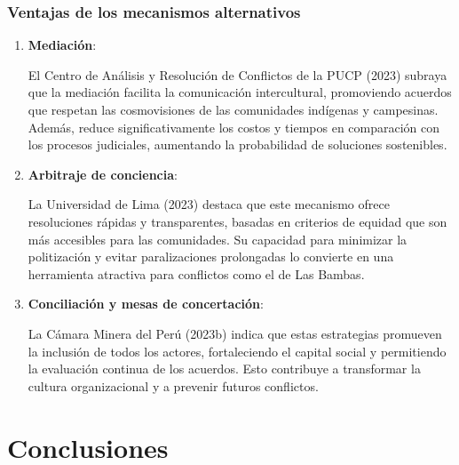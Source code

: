 \documentclass[
  stu,
  floatsintext,
  longtable,
  a4paper,
  nolmodern,
  notxfonts,
  notimes,
  colorlinks=true,linkcolor=blue,citecolor=blue,urlcolor=blue]{apa7}
\begin{document}
\subsubsection{Ventajas de los mecanismos
alternativos}\label{ventajas-de-los-mecanismos-alternativos}

\begin{enumerate}
\def\labelenumi{\arabic{enumi}.}
\item
  \textbf{Mediación}:

  El Centro de Análisis y Resolución de Conflictos de la PUCP (2023)
  subraya que la mediación facilita la comunicación intercultural,
  promoviendo acuerdos que respetan las cosmovisiones de las comunidades
  indígenas y campesinas. Además, reduce significativamente los costos y
  tiempos en comparación con los procesos judiciales, aumentando la
  probabilidad de soluciones sostenibles.
\item
  \textbf{Arbitraje de conciencia}:

  La Universidad de Lima (2023) destaca que este mecanismo ofrece
  resoluciones rápidas y transparentes, basadas en criterios de equidad
  que son más accesibles para las comunidades. Su capacidad para
  minimizar la politización y evitar paralizaciones prolongadas lo
  convierte en una herramienta atractiva para conflictos como el de Las
  Bambas.
\item
  \textbf{Conciliación y mesas de concertación}:

  La Cámara Minera del Perú (2023b) indica que estas estrategias
  promueven la inclusión de todos los actores, fortaleciendo el capital
  social y permitiendo la evaluación continua de los acuerdos. Esto
  contribuye a transformar la cultura organizacional y a prevenir
  futuros conflictos.
\end{enumerate}

\section{Conclusiones}\label{conclusiones}
\end{document}
